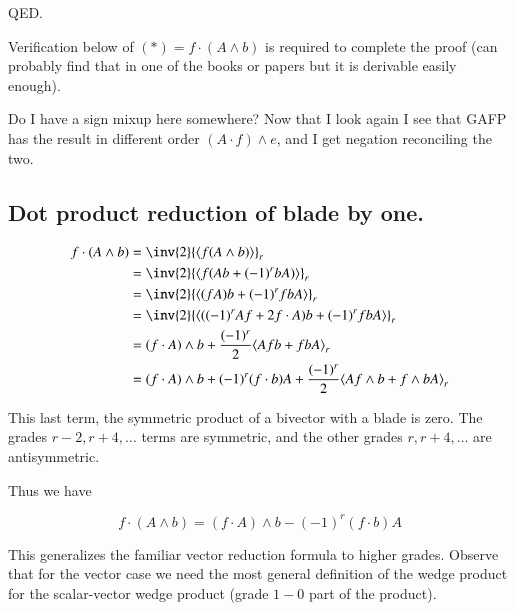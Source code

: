 \documentclass{article}      %
\newcommand{\gpgrade}[2] {{\left\langle{{#1}}\right\rangle}_{#2}}
\begin{document}
QED.

Verification below of $(*) = f \cdot (A \wedge b)$ is required to complete the proof (can probably find that in one of the books or papers but it is derivable
easily enough).

Do I have a sign mixup here somewhere?  Now that I look again I see that GAFP
has the result in different order $(A \cdot f) \wedge e$, and I get negation
reconciling the two.

\subsection{ Dot product reduction of blade by one. }

\begin{align*}
f \cdot (A \wedge b)
&= \inv{2} \gpgrade{f (A \wedge b)}{r} \\
&= \inv{2} \gpgrade{f (A b + (-1)^r b A)}{r} \\
&= \inv{2} \gpgrade{(f A) b + (-1)^r f b A}{r} \\
&= \inv{2} \gpgrade{((-1)^r A f + 2 f \cdot A) b + (-1)^r f b A}{r} \\
&= (f \cdot A) \wedge b + \frac{(-1)^r}{2} \gpgrade{A f b + f b A}{r} \\
&= (f \cdot A) \wedge b + (-1)^r (f \cdot b) A
+ \frac{(-1)^r}{2} \gpgrade{A f \wedge b + f \wedge b A}{r} \\
\end{align*}

This last term, the symmetric product of a bivector with a blade is zero.
The grades $r-2, r+4, \ldots$ terms are symmetric, and the other grades
$r, r+4, \ldots$ are antisymmetric.

Thus we have

\begin{equation}
f \cdot (A \wedge b)
= (f \cdot A) \wedge b - (-1)^r (f \cdot b) A
\end{equation}

This generalizes the familiar vector reduction formula to higher grades.
Observe that for the vector case we need the most general definition
of the wedge product for the scalar-vector wedge product (grade $1-0$ part of the product).
\end{document}
